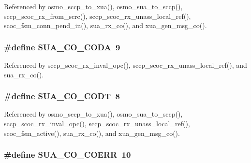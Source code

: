 Referenced by osmo\+\_\+sccp\+\_\+to\+\_\+xua(), osmo\+\_\+sua\+\_\+to\+\_\+sccp(), sccp\+\_\+scoc\+\_\+rx\+\_\+from\+\_\+scrc(), sccp\+\_\+scoc\+\_\+rx\+\_\+unass\+\_\+local\+\_\+ref(), scoc\+\_\+fsm\+\_\+conn\+\_\+pend\+\_\+in(), sua\+\_\+rx\+\_\+co(), and xua\+\_\+gen\+\_\+msg\+\_\+co().

\subsubsection[{S\+U\+A\+\_\+\+C\+O\+\_\+\+C\+O\+DA}]{\setlength{\rightskip}{0pt plus 5cm}\#define S\+U\+A\+\_\+\+C\+O\+\_\+\+C\+O\+DA~9}\label{sua_8h_ac6dd6d3db14a95181c35c8526aef7a47}


Referenced by sccp\+\_\+scoc\+\_\+rx\+\_\+inval\+\_\+opc(), sccp\+\_\+scoc\+\_\+rx\+\_\+unass\+\_\+local\+\_\+ref(), and sua\+\_\+rx\+\_\+co().

\subsubsection[{S\+U\+A\+\_\+\+C\+O\+\_\+\+C\+O\+DT}]{\setlength{\rightskip}{0pt plus 5cm}\#define S\+U\+A\+\_\+\+C\+O\+\_\+\+C\+O\+DT~8}\label{sua_8h_afa066bac48b27ebc8625f10162b09620}


Referenced by osmo\+\_\+sccp\+\_\+to\+\_\+xua(), osmo\+\_\+sua\+\_\+to\+\_\+sccp(), sccp\+\_\+scoc\+\_\+rx\+\_\+inval\+\_\+opc(), sccp\+\_\+scoc\+\_\+rx\+\_\+unass\+\_\+local\+\_\+ref(), scoc\+\_\+fsm\+\_\+active(), sua\+\_\+rx\+\_\+co(), and xua\+\_\+gen\+\_\+msg\+\_\+co().

\subsubsection[{S\+U\+A\+\_\+\+C\+O\+\_\+\+C\+O\+E\+RR}]{\setlength{\rightskip}{0pt plus 5cm}\#define S\+U\+A\+\_\+\+C\+O\+\_\+\+C\+O\+E\+RR~10}\label{sua_8h_adb4d2346889efa2e11d08b52552f1140}



